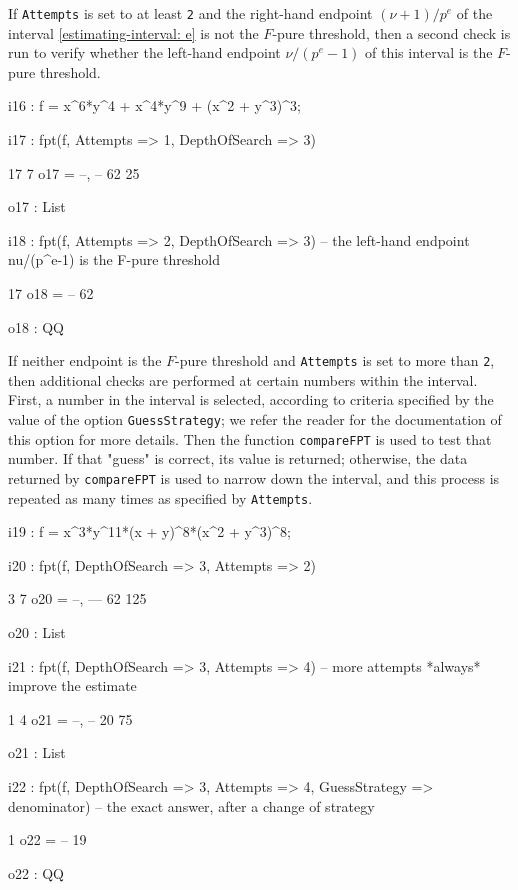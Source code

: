 \documentclass{amsart}
\begin{document}
If  {\tt Attempts} is set to at least {\tt 2} and the right-hand endpoint $(\nu+1)/p^e$ of the interval \eqref{estimating-interval: e} is not the $F$-pure threshold, then a second check is run to verify whether the left-hand endpoint $\nu/(p^e-1)$ of this interval is the $F$-pure threshold.

{\small
{}
\begin{MyVerbatim}

i16 : f = x^6*y^4 + x^4*y^9 + (x^2 + y^3)^3;

i17 : fpt(f, Attempts => 1, DepthOfSearch => 3)

       17   7
o17 = {--, --}
       62  25

o17 : List

i18 : fpt(f, Attempts => 2, DepthOfSearch => 3) -- the left-hand endpoint
      nu/(p^e-1) is the F-pure threshold

      17
o18 = --
      62

o18 : QQ

\end{MyVerbatim}
}

If neither endpoint is the $F$-pure threshold and {\tt Attempts} is set to more than {\tt 2}, then  additional checks are performed at certain numbers within the interval.
First, a number in the interval is selected, according to criteria specified by the value of the option {\tt GuessStrategy}; we refer the reader for the documentation of this option for more details.  
Then the function {\tt compareFPT} is used to test that number. If that "guess" is correct, its value is returned; otherwise, the data returned by {\tt compareFPT} is used to narrow down the interval, and this process is repeated as many times as specified by {\tt Attempts}.

{\small
{}
\begin{MyVerbatim}

i19 : f = x^3*y^11*(x + y)^8*(x^2 + y^3)^8;

i20 : fpt(f, DepthOfSearch => 3, Attempts => 2)

        3   7
o20 = {--, ---}
       62  125

o20 : List

i21 : fpt(f, DepthOfSearch => 3, Attempts => 4) -- more attempts *always* 
      improve the estimate

        1   4
o21 = {--, --}
       20  75

o21 : List

i22 : fpt(f, DepthOfSearch => 3, Attempts => 4, GuessStrategy => denominator) 
      -- the exact answer, after a change of strategy

       1
o22 = --
      19

o22 : QQ
\end{MyVerbatim}
}
\medspace
\end{document}
